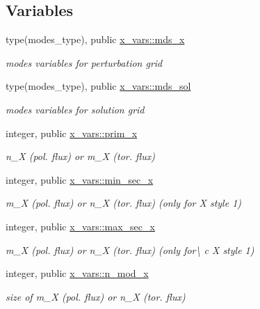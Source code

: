 \subsection*{Variables}
\begin{DoxyCompactItemize}
\item 
type(modes\+\_\+type), public \hyperlink{namespacex__vars_a690d4228d2a81ec5a7a6cd13be3a56a1}{x\+\_\+vars\+::mds\+\_\+x}
\begin{DoxyCompactList}\small\item\em modes variables for perturbation grid \end{DoxyCompactList}\item 
type(modes\+\_\+type), public \hyperlink{namespacex__vars_ac74f59668de6caca7038decc7191c6a1}{x\+\_\+vars\+::mds\+\_\+sol}
\begin{DoxyCompactList}\small\item\em modes variables for solution grid \end{DoxyCompactList}\item 
integer, public \hyperlink{namespacex__vars_ae7f7061534fb3ad68a538cdcea20d1d9}{x\+\_\+vars\+::prim\+\_\+x}
\begin{DoxyCompactList}\small\item\em {\ttfamily n\+\_\+X} (pol. flux) or {\ttfamily m\+\_\+X} (tor. flux) \end{DoxyCompactList}\item 
integer, public \hyperlink{namespacex__vars_a0d63825aabc4c71623c6ea7ffe033949}{x\+\_\+vars\+::min\+\_\+sec\+\_\+x}
\begin{DoxyCompactList}\small\item\em {\ttfamily m\+\_\+X} (pol. flux) or {\ttfamily n\+\_\+X} (tor. flux) (only for {\ttfamily X} style 1) \end{DoxyCompactList}\item 
integer, public \hyperlink{namespacex__vars_ae19ca528c5688228ff20912a45290b2a}{x\+\_\+vars\+::max\+\_\+sec\+\_\+x}
\begin{DoxyCompactList}\small\item\em {\ttfamily m\+\_\+X} (pol. flux) or {\ttfamily n\+\_\+X} (tor. flux) (only for\textbackslash{} c X style 1) \end{DoxyCompactList}\item 
integer, public \hyperlink{namespacex__vars_a2e8fe6c5fe1cf61704bf176925d2b02e}{x\+\_\+vars\+::n\+\_\+mod\+\_\+x}
\begin{DoxyCompactList}\small\item\em size of {\ttfamily m\+\_\+X} (pol. flux) or {\ttfamily n\+\_\+X} (tor. flux) \end{DoxyCompactList}\item 

\end{DoxyCompactItemize}
